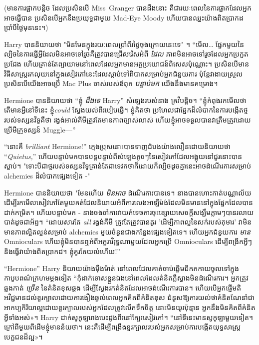 {{{{{{(មានការផ្អាកបន្តិច ដែលប្រសិនបើ Miss~Granger បានដឹងនោះ គឺជារយៈពេលនៃការផ្អាកដែលអ្នកអាចធ្វើបាន ប្រសិនបើអ្នកនឹងប្រយុទ្ធជាមួយ Mad-Eye Moody ហើយបានឈ្នះយ៉ាងពិតប្រាកដប្រាំបីថ្ងៃមុននេះ។)

Harry បាននិយាយថា "មិនមែនក្នុងរយៈពេលប្រាំពីរថ្ងៃចុងក្រោយនេះទេ" ។ “មើល… ផ្នែកមួយនៃល្បិចនៃការធ្វើអ្វីដែលមិនអាចទៅរួចគឺត្រូវបានជ្រើសរើសអំពី \emph{ដែល} ភាពមិនអាចទៅរួចដែលអ្នកប្រកួតប្រជែង ហើយគ្រាន់តែព្យាយាមនៅពេលដែលអ្នកមានអត្ថប្រយោជន៍ពិសេសប៉ុណ្ណោះ។ ប្រសិនបើមានវិធីសាស្រ្តរកលុយនៅក្នុងសៀវភៅនេះដែលស្តាប់ទៅពិបាកសម្រាប់អ្នកជំនួយការ ប៉ុន្តែវាងាយស្រួលប្រសិនបើយើងអាចប្រើ Mac Plus ចាស់របស់ឪពុក \emph{បន្ទាប់មក} យើងនឹងមានគម្រោង។

Hermione បាននិយាយថា “ខ្ញុំ \emph{ដឹងទេ} Harry” សំឡេងរបស់នាង គ្រវីបន្តិច។ “ខ្ញុំកំពុងរកមើលថាតើមានអ្វីនៅទីនេះ ខ្ញុំ\emph{could} ស្វែងយល់ពីរបៀបធ្វើ។ ខ្ញុំគិតថា ប្រហែលជាផ្នែកដ៏លំបាកនៃការបង្កើតថ្មរបស់ទស្សនវិទូគឺថា រង្វង់អាល់គីមីត្រូវតែមានភាពច្បាស់លាស់ ហើយខ្ញុំអាចទទួលបានវាត្រឹមត្រូវដោយប្រើមីក្រូទស្សន៍ Muggle—”

“នោះ​គឺ \emph{brilliant} Hermione!” ក្មេងប្រុសនោះបានទាញដំបងយ៉ាងលឿនដោយនិយាយថា “\emph{Quietus,}” ហើយបន្ទាប់មកបានបន្តបន្ទាប់ពីសំឡេងតូចៗនៃសៀវភៅដែលអង្គុយនៅជួរនោះបានស្លាប់។ "ទោះបីជាថ្មរបស់ទស្សនវិទូគ្រាន់តែជាទេវកថាក៏ដោយក៏ល្បិចដូចគ្នានេះអាចដំណើរការសម្រាប់ alchemies ដ៏លំបាកផ្សេងទៀត -"

Hermione បាននិយាយថា "មែនហើយ \emph{មិនអាច} ដំណើរការបានទេ។ នាង​បាន​ហោះ​កាត់​បណ្ណាល័យ​ដើម្បី​រក​មើល​សៀវភៅ​តែ​មួយ​គត់​ដែល​និយាយ​អំពី​ការ​លេង​អាឡឺម៉ង់​ដែល​មិន​មាន​នៅ​ក្នុង​ផ្នែក​ដែល​បាន​ដាក់​កម្រិត។ ហើយបន្ទាប់មក - នាងចងចាំការវាយកំទេចការចុះខ្សោយសេចក្តីសង្ឃឹមភ្លាមៗបានរលាយបាត់ដូចជាអ័ព្ទ។ “ដោយសារតែ \emph{all} រង្វង់គីមី ត្រូវតែត្រូវបានគូរ 'ដើម្បីភាពល្អនៃសក់របស់កុមារ' វាមិនមានភាពល្អិតល្អន់សម្រាប់ alchemies មួយចំនួនជាងកន្លែងផ្សេងទៀតទេ។ ហើយអ្នកជំនួយការ \emph{មាន} Omnioculars ហើយខ្ញុំមិនបានឮអំពីអក្ខរាវិរុទ្ធណាមួយដែលអ្នកប្រើ Omnioculars ដើម្បីពង្រីកអ្វីៗ និងធ្វើវាយ៉ាងពិតប្រាកដ។ ខ្ញុំគួរតែយល់ហើយ!”

“Hermione” Harry និយាយយ៉ាងម៉ឺងម៉ាត់ នៅពេលដែលគាត់ចាប់ផ្តើមជីកកកាយចូលទៅក្នុងកាបូបពណ៌ក្រហមម្តងទៀត “កុំដាក់ទោសខ្លួនឯងនៅពេលដែលគំនិតភ្លឺស្វាងមិនដំណើរការ។ អ្នកត្រូវឆ្លងកាត់ \emph{ច្រើន} នៃគំនិតខុសឆ្គង ដើម្បីស្វែងរកគំនិតដែលអាចដំណើរការបាន។ ហើយ​បើ​អ្នក​ផ្ញើ​មតិ​អវិជ្ជមាន​ដល់​ខួរក្បាល​ដោយ​ការ​ងឿង​ឆ្ងល់​ពេល​អ្នក​គិត​ពី​គំនិត​ខុស ជំនួស​ឱ្យ​ការ​យល់​ថា​គំនិត​ណែនាំ​ជា​អាកប្បកិរិយា​ល្អ​ដោយ​ខួរក្បាល​របស់​អ្នក​ដែល​ត្រូវ​លើក​ទឹកចិត្ត នោះ​មិន​យូរ​ប៉ុន្មាន អ្នក​នឹង​មិន​គិត​ពី​គំនិត​អ្វី​ទាំង​អស់»។ Harry ដាក់សូកូឡារាងបេះដូងពីរនៅក្បែរសៀវភៅ។ “នៅទីនេះមានសូកូឡាមួយទៀត។ ក្រៅ​ពី​មួយ​ពី​ដើម​ខ្ញុំ​មាន​ន័យ​ថា​។ នេះ​គឺ​ដើម្បី​ពង្រឹង​ខួរក្បាល​របស់​អ្នក​សម្រាប់​ការ​បង្កើត​យុទ្ធសាស្ត្រ​បេក្ខជន​ដ៏​ល្អ»។

}}}}}}
